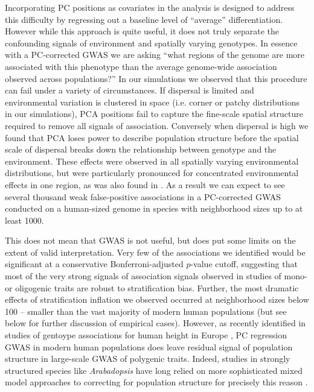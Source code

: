 \documentclass[11pt,twoside,lineno]{preprint}
\begin{document}
Incorporating PC positions as covariates in the analysis \citep{Price2006} is designed to address this difficulty by regressing out a baseline level of ``average'' differentiation. However while this approach is quite useful, it does not truly separate the confounding signals of environment and spatially varying genotypes. In essence with a PC-corrected GWAS we are asking ``what regions of the genome are more associated with this phenotype than the average genome-wide association observed across populations?'' In our simulations we observed that this procedure can fail under a variety of circumstances. If dispersal is limited and environmental variation is clustered in space (i.e. corner or patchy distributions in our simulations), PCA positions fail to capture the fine-scale spatial structure required to remove all signals of association. Conversely when dispersal is high we found that PCA loses power to describe population structure before the spatial scale of dispersal breaks down the relationship between genotype and the environment. These effects were observed in all spatially varying environmental distributions, but were particularly pronounced for concentrated environmental effects in one region, as was also found in \cite{Mathieson2012}. As a result we can expect to see several thousand weak false-positive associations in a PC-corrected GWAS conducted on a human-sized genome in species with neighborhood sizes up to at least 1000. 

This does not mean that GWAS is not useful, but does put some limits on the extent of valid interpretation. Very few of the associations we identified would be significant at a conservative Bonferroni-adjusted $p$-value cutoff, suggesting that most of the very strong signals of association signals observed in studies of mono- or oligogenic traits are robust to stratification bias. Further, the most dramatic effects of stratification inflation we observed occurred at neighborhood sizes below 100 -- smaller than the vast majority of modern human populations (but see below for further discussion of empirical cases). However, as recently identified in studies of gentoype associations for human height in Europe \citep{Berg2018,Sohail2018}, PC regression GWAS in modern human populations does leave residual signal of population structure in large-scale GWAS of polygenic traits. Indeed, studies in strongly structured species like \textit{Arabadopsis} have long relied on more sophisticated mixed model approaches to correcting for population structure for precisely this reason \citep{Aranzana2005,Sasaki2015}.
\end{document}
